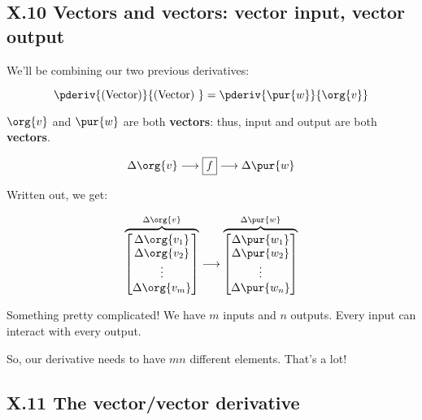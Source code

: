     \subsection*{X.10 \quad Vectors and vectors: vector input, vector output}  
    
        We'll be combining our two previous derivatives: 
        
        \begin{equation}
            \pderiv{ \text{(Vector)} } { \text{(Vector) } }
            =
            \pderiv{ \pur{w} }{ \org{v} } 
        \end{equation}
        
        $\org{v}$ and $\pur{w}$ are both \textbf{vectors}: thus, input and output are both \textbf{vectors}.
        
        \begin{equation}
            \Delta \org{v}
            \longrightarrow
            \boxed{f}
            \longrightarrow
            \Delta \pur{w}
        \end{equation}
        
        Written out, we get:
        
        \begin{equation}
            \overbrace{
                \begin{bmatrix}
                    \Delta \org{v_1}\\ \Delta \org{v_2}\\ \vdots \\ \Delta \org{v_m}
                \end{bmatrix}
            }^{\Delta \org{v}}
            \longrightarrow 
            \overbrace{
                \begin{bmatrix}
                    \Delta \pur{w_1}\\ \Delta \pur{w_2}\\ \vdots \\ \Delta \pur{w_n}
                \end{bmatrix}
            }^{\Delta \pur{w}}
        \end{equation}
        
        Something pretty complicated! We have $m$ inputs and $n$ outputs. Every input can interact with every output.
        
        So, our derivative needs to have $mn$ different elements. That's a lot!
    
    \secdiv
    
    \subsection*{X.11 \quad The vector/vector derivative}  
    
